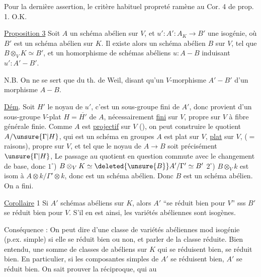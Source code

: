 Pour la dernière assertion, le critère
habituel  propreté  ramène au
Cor. 4 \unsure{,} de prop. 1. O.K.


\uline{Proposition 3} Soit $A$ un schéma abélien sur $V$,
et $u':A':A_K\longrightarrow B'$ une isogénie, où $B'$ est
un schéma abélien sur $K$. Il existe alors
un schéma abélien $B$ sur $V$, 
tel que $B\otimes_V K\simeq B'$, et un 
homorphisme  de schémas abéliens $u:A\mathrel{-}B$
induisant $u':A'\mathrel{-}B'$.

N.B. On ne se sert que du th. de Weil,
disant qu'un $V$-morphisme 
$A'\mathrel{-}B'$  d'un morphisme $A\mathrel{-}B$.

\uline{Dém}. Soit $H'$ le noyau de $u'$,
c'est un sous-groupe fini de $A'$, donc
provient d'un sous-groupe $V$-plat $H=\overline{H'}$ de
$A$, nécessairement \uline{fini} sur $V$,  propre  sur
$V$ à fibre générale finie. Comme
$A$ est \uline{projectif} sur $V$ (), on
peut construire le  quotient $A/\unsure{\Gamma|H}$,
qui est un schéma en groupes
 $A$ est plat sur $V$, \uline{plat} sur $V$,
($=$ raisons), propre sur $V$, et tel que
le noyau de $A\longrightarrow B$ soit précisément $\unsure{\Gamma|H}$,
 Le passage au quotient en question
commute avec le changement de base, donc
$1^\circ$) $B\otimes_V K\simeq\deleted{\unsure{B}}A'/\Gamma'\simeq B'$ \qquad $2^\circ$) $B\otimes_V k$ est 
isom à  $A\otimes k/\Gamma'\otimes k$, donc est un
schéma abélien. Donc $B$ est un
schéma abélien. On a fini.

\uline{Corollaire} 1  Si $A'$ 
schémas abéliens  sur $K$, alors $A'$ ``se
réduit bien pour $V$'' sss $B'$ se réduit
bien pour $V$. S'il en est ainsi, les variétés
 abéliennes  sont isogènes.

 Conséquence : On peut dire d'une
classe de variétés abéliennes mod isogénie
(p.ex. simple) si elle se réduit bien ou
non, et  parler de la
 classe réduite. Bien
entendu, une somme de classes
de  abéliens sur $K$ qui se
réduisent bien, se réduit bien. En
particulier, si les composantes simples de
$A'$ se réduisent bien, $A'$ se réduit bien. On
sait prouver la réciproque, qui 
au

